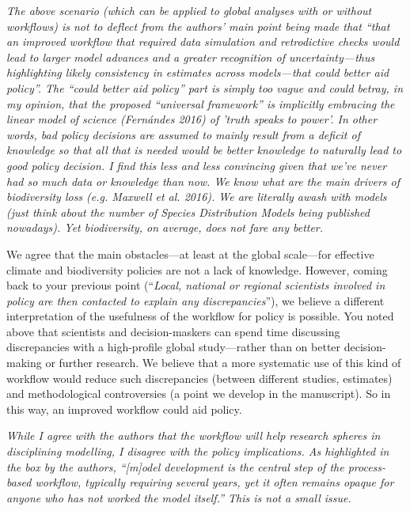 \documentclass[11pt,letter]{article}
\begin{document}
\begin{mybox}
\emph{The above scenario (which can be applied to global analyses with or without workflows) is not
to deflect from the authors' main point being made that “that an improved workflow that
required data simulation and retrodictive checks would lead to larger model advances and a
greater recognition of uncertainty—thus highlighting likely consistency in estimates across
models—that could better aid policy”. The “could better aid policy” part is simply too vague
and could betray, in my opinion, that the proposed “universal framework” is implicitly
embracing the linear model of science (Fernándes 2016) of 'truth speaks to power'. In other
words, bad policy decisions are assumed to mainly result from a deficit of knowledge so that
all that is needed would be better knowledge to naturally lead to good policy decision. I find
this less and less convincing given that we’ve never had so much data or knowledge than now.
We know what are the main drivers of biodiversity loss (e.g. Maxwell et al. 2016). We are
literally awash with models (just think about the number of Species Distribution Models being
published nowadays). Yet biodiversity, on average, does not fare any better.}  
\end{mybox}

We agree that the main obstacles---at least at the global scale---for effective climate and biodiversity policies are not a lack of knowledge. However, coming back to your previous point (``\emph{Local, national or regional scientists involved in policy are then contacted to explain any discrepancies}''), we believe a different interpretation of the usefulness of the workflow for policy is possible. You noted above that scientists and decision-maskers can spend time discussing discrepancies with a high-profile global study---rather than on better decision-making or further research. We believe that a more systematic use of this kind of workflow would reduce such discrepancies (between different studies, estimates) and methodological controversies (a point we develop in the manuscript). So in this way, an improved workflow could aid policy.

\begin{mybox}
\emph{While I agree with the authors that the workflow will help research spheres in disciplining
modelling, I disagree with the policy implications. As highlighted in the box by the authors,
“[m]odel development is the central step of the process-based workflow, typically requiring
several years, yet it often remains opaque for anyone who has not worked the model itself.”
This is not a small issue.}  
\end{mybox}
\end{document}
